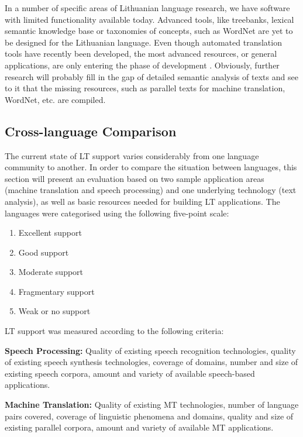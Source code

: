 \begin{multicols}{2}
In a number of specific areas of Lithuanian language research, we have software with limited functionality available today.  Advanced tools, like treebanks, lexical semantic knowledge base or taxonomies of concepts, such as WordNet are yet to be designed for the Lithuanian language. Even though automated translation tools have recently been developed, the most advanced resources, or general applications, are only entering the phase of development  \cite{td1}. Obviously, further research will probably fill in the gap of detailed semantic analysis of texts and see to it that the missing resources, such as parallel texts for machine translation, WordNet, etc. are compiled.

\subsection{Cross-language Comparison}

The current state of LT support varies considerably from one language community to another. In order to compare the situation between languages, this section will present an evaluation based on two sample application areas (machine translation and speech processing) and one underlying technology (text analysis), as well as basic resources needed for building LT applications. The languages were categorised using the following five-point scale: 

\begin{enumerate}
\item Excellent support
\item Good support
\item Moderate support
\item Fragmentary support
\item Weak or no support
\end{enumerate}

LT support was measured according to the following criteria:

\textbf{Speech Processing:} Quality of existing speech recognition technologies, quality of existing speech synthesis technologies, coverage of domains, number and size of existing speech corpora, amount and variety of available speech-based applications.

\textbf{Machine Translation:} Quality of existing MT technologies, number of language pairs covered, coverage of linguistic phenomena and domains, quality and size of existing parallel corpora, amount and variety of available MT applications.


\end{multicols}
